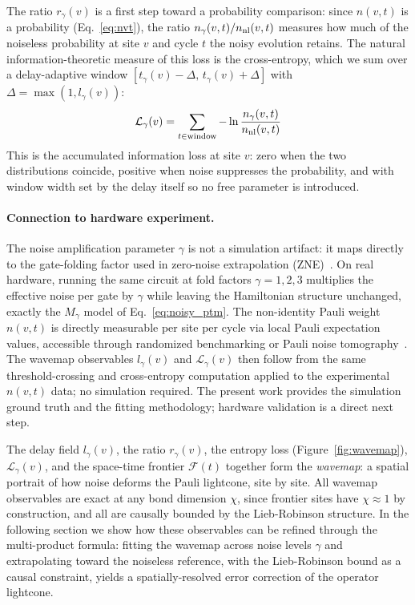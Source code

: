\documentclass[12pt]{article}
\begin{document}
The ratio $r_\gamma(v)$ is a first step toward a probability comparison:
since $n(v,t)$ is a probability (Eq.~\ref{eq:nvt}), the ratio
$n_\gamma(v,t)/n_{\rm nl}(v,t)$ measures how much of the noiseless
probability at site $v$ and cycle $t$ the noisy evolution retains.
The natural information-theoretic measure of this loss is the
cross-entropy, which we sum over a delay-adaptive window
$[t_\gamma(v) - \Delta,\, t_\gamma(v) + \Delta]$ with
$\Delta = \max(1, l_\gamma(v))$:
\begin{equation}
    \mathcal{L}_\gamma(v) = \sum_{t \in \text{window}} -\ln\frac{n_\gamma(v,t)}{n_{\rm nl}(v,t)}
    \label{eq:loss2}
\end{equation}
This is the accumulated information loss at site $v$: zero when the two
distributions coincide, positive when noise suppresses the probability,
and with window width set by the delay itself so no free parameter is introduced.

\paragraph{Connection to hardware experiment.}
The noise amplification parameter $\gamma$ is not a simulation artifact:
it maps directly to the gate-folding factor used in zero-noise extrapolation
(ZNE)~\cite{giurgica2020digital}.
On real hardware, running the same circuit at fold factors $\gamma=1,2,3$
multiplies the effective noise per gate by $\gamma$ while leaving the
Hamiltonian structure unchanged, exactly the $M_\gamma$ model of
Eq.~\eqref{eq:noisy_ptm}.
The non-identity Pauli weight $n(v,t)$ is directly measurable per site per
cycle via local Pauli expectation values, accessible through randomized
benchmarking or Pauli noise tomography~\cite{rudolph2025simulating}.
The wavemap observables $l_\gamma(v)$ and $\mathcal{L}_\gamma(v)$ then
follow from the same threshold-crossing and cross-entropy computation
applied to the experimental $n(v,t)$ data; no simulation required.
The present work provides the simulation ground truth and the fitting
methodology; hardware validation is a direct next step.

The delay field $l_\gamma(v)$, the ratio $r_\gamma(v)$, the entropy loss
(Figure~\ref{fig:wavemap}),
$\mathcal{L}_\gamma(v)$, and the space-time frontier $\mathcal{F}(t)$
together form the \emph{wavemap}: a spatial portrait of how noise deforms
the Pauli lightcone, site by site.
All wavemap observables are exact at any bond dimension $\chi$, since frontier
sites have $\chi\approx 1$ by construction, and all are causally bounded
by the Lieb-Robinson structure.
In the following section we show how these observables can be refined through
the multi-product formula: fitting the wavemap across noise levels $\gamma$
and extrapolating toward the noiseless reference, with the Lieb-Robinson bound
as a causal constraint, yields a spatially-resolved error correction of the
operator lightcone.
\end{document}
